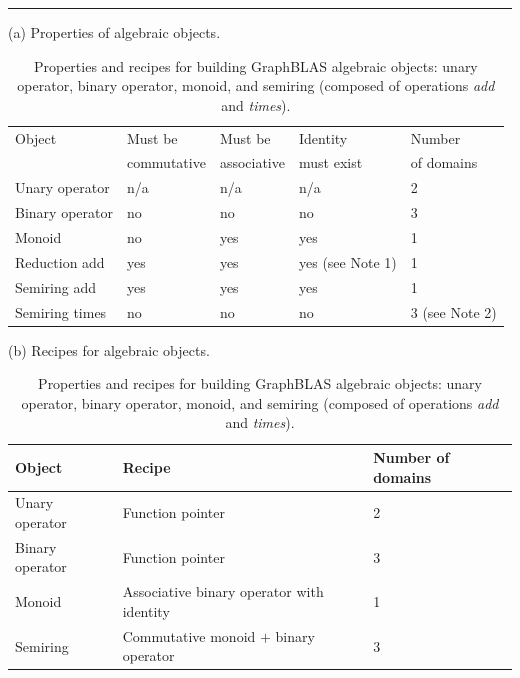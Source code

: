 
\begin{table}
    \hrule
    \begin{center}
        \caption[Properties and recipes for building GraphBLAS algebraic objects.]{Properties and recipes for building GraphBLAS algebraic objects: unary operator, binary operator, monoid, and semiring (composed of operations \emph{add} and \emph{times}).}
        \label{Tab:AlgebraicObjects}
        
        \vspace{1\baselineskip}
        (a) Properties of algebraic objects.
        \vspace{1\baselineskip}
        
        \begin{tabular}{l|l|l|l|l}
            Object          & Must be       & Must be        & Identity         & Number \\
                            & commutative   & associative    & must exist       & of domains  \\
            \hline
            Unary operator  & n/a           & n/a            & n/a              & 2  \\
            Binary operator & no            & no             & no               & 3  \\
            Monoid          & no            & yes            & yes              & 1  \\
            Reduction add   & yes           & yes            & yes (see Note 1) & 1  \\
            Semiring add    & yes           & yes            & yes              & 1  \\
            Semiring times  & no            & no             & no               & 3  (see Note 2) \\
        \end{tabular}
        
        \vspace{1\baselineskip}
        (b) Recipes for algebraic objects.
        \vspace{1\baselineskip}
        
        \begin{tabular}{l|l|l}
            Object          & Recipe                                        & Number of domains \\
            \hline
            Unary operator  & Function pointer                              & 2 \\
            Binary operator & Function pointer                              & 3 \\
            Monoid          & Associative binary operator with identity     & 1 \\
            Semiring        & Commutative monoid $+$ binary operator        & 3 \\
        \end{tabular}
        

\end{center}
\end{table}

